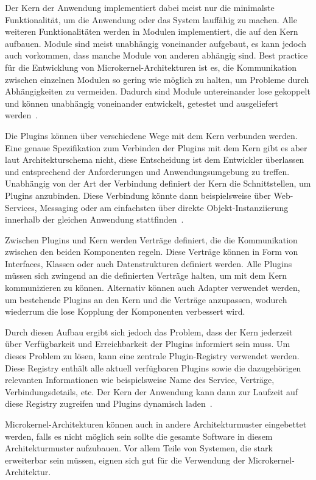 \documentclass[acmtog]{acmart}
\begin{document}
Der Kern der Anwendung implementiert dabei meist nur die minimalste Funktionalität, um die Anwendung oder das System lauffähig zu machen.
Alle weiteren Funktionalitäten werden in Modulen implementiert, die auf den Kern aufbauen.
Module sind meist unabhängig voneinander aufgebaut, es kann jedoch auch vorkommen, dass manche Module von anderen abhängig sind.
Best practice für die Entwicklung von Microkernel-Architekturen ist es, die Kommunikation zwischen einzelnen Modulen so gering wie möglich zu halten, um Probleme durch Abhängigkeiten zu vermeiden.
Dadurch sind Module untereinander lose gekoppelt und können unabhängig voneinander entwickelt, getestet und ausgeliefert werden~\cite[22]{architecturePatterns}.

Die Plugins können über verschiedene Wege mit dem Kern verbunden werden.
Eine genaue Spezifikation zum Verbinden der Plugins mit dem Kern gibt es aber laut Architekturschema nicht, diese Entscheidung ist dem Entwickler überlassen und entsprechend der Anforderungen und Anwendungsumgebung zu treffen.
Unabhängig von der Art der Verbindung definiert der Kern die Schnittstellen, um Plugins anzubinden.
Diese Verbindung könnte dann beispielsweise über Web-Services, Messaging oder am einfachsten über direkte Objekt-Instanziierung innerhalb der gleichen Anwendung stattfinden~\cite[22-23]{architecturePatterns}.

Zwischen Plugins und Kern werden Verträge definiert, die die Kommunikation zwischen den beiden Komponenten regeln.
Diese Verträge können in Form von Interfaces, Klassen oder auch Datenstrukturen definiert werden.
Alle Plugins müssen sich zwingend an die definierten Verträge halten, um mit dem Kern kommunizieren zu können.
Alternativ können auch Adapter verwendet werden, um bestehende Plugins an den Kern und die Verträge anzupassen, wodurch wiederrum die lose Kopplung der Komponenten verbessert wird.

Durch diesen Aufbau ergibt sich jedoch das Problem, dass der Kern jederzeit über Verfügbarkeit und Erreichbarkeit der Plugins informiert sein muss.
Um dieses Problem zu lösen, kann eine zentrale Plugin-Registry verwendet werden.
Diese Registry enthält alle aktuell verfügbaren Plugins sowie die dazugehörigen relevanten Informationen wie beispielsweise Name des Service, Verträge, Verbindungsdetails, etc.
Der Kern der Anwendung kann dann zur Laufzeit auf diese Registry zugreifen und Plugins dynamisch laden~\cite[22]{architecturePatterns}.

Microkernel-Architekturen können auch in andere Architekturmuster eingebettet werden, falls es nicht möglich sein sollte die gesamte Software in diesem Architekturmuster aufzubauen.
Vor allem Teile von Systemen, die stark erweiterbar sein müssen, eignen sich gut für die Verwendung der Microkernel-Architektur.
\end{document}
